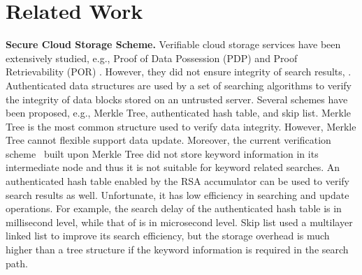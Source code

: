\section{Related Work}
\noindent\textbf{Secure Cloud Storage Scheme.} Verifiable cloud storage services have been extensively studied, e.g., Proof of Data Possession (PDP) \cite{ateniese2007provable, ateniese2008scalable, erway2015dynamic,zhu2012cooperative} and Proof  Retrievability (POR) \cite{juels2007pors, bowers2009proofs, stefanov2012iris}.  However, they did not ensure  integrity of search results,  .
Authenticated data structures are used by a set of searching algorithms to verify the integrity of data blocks stored on an untrusted server. Several schemes have been proposed, e.g., Merkle Tree\cite{merkle1987digital}, authenticated hash table\cite{papamanthou2008authenticated}, and  skip list\cite{pugh1990skip,goodrich2001implementation}. Merkle Tree is the most common structure used to verify data integrity. However, Merkle Tree cannot flexible support data update. %
Moreover, the current verification scheme~\cite{kamara2011cs2} built upon Merkle Tree did not store keyword information in its intermediate node and thus it is not suitable for keyword related searches. An authenticated hash table enabled by the RSA accumulator can be used to verify search results as well. Unfortunate, it has low efficiency in searching and update operations. For example, the search delay of the authenticated hash table is in millisecond level, while that of \name is in microsecond level. Skip list used a multilayer linked list to improve its search efficiency, but the storage overhead is much higher than a tree structure if the keyword information is required in the search path.

